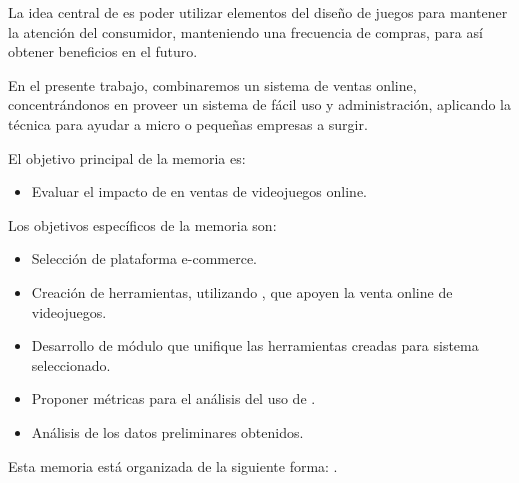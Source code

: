 La idea central de  {\GAM} es poder utilizar elementos del diseño de juegos
para mantener la atención del consumidor, manteniendo una frecuencia de compras,
para así obtener beneficios en el futuro.

En el presente trabajo, combinaremos un sistema de ventas online, concentrándonos
en proveer un sistema de fácil uso y administración, aplicando la técnica {\GAM}
para ayudar a micro o pequeñas empresas a surgir.

El objetivo principal de la memoria es:

\begin{itemize}
    \item Evaluar el impacto de {\GAM} en ventas de videojuegos online.
\end{itemize}

Los objetivos específicos de la memoria son:
\begin{itemize}
    \item Selección de plataforma e-commerce.
    \item Creación de herramientas, utilizando {\GAM}, que apoyen la
          venta online de videojuegos.
    \item Desarrollo de módulo que unifique las herramientas creadas para sistema
          seleccionado.
    \item Proponer métricas para el análisis del uso de {\GAM}.
    \item Análisis de los datos preliminares obtenidos.
\end{itemize}

Esta memoria está organizada de la siguiente forma:
.
